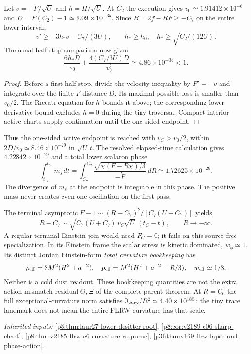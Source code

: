 \documentclass[12pt,a4paper]{article}
\begin{document}
Let $v=-\dot F/\sqrt U$ and $h=H/\sqrt U$. At $C_2$ the execution gives
$v_0\simeq1.91412\times10^{-6}$ and
$D=F(C_2)-1\simeq8.09\times10^{-35}$. Since $B=2f-RF\ge-C_7$
on the entire lower interval,
\[
 v'\ge-3h_*v-C_7/(3U),\qquad
 h_*\ge h_0,\quad h_*\ge\sqrt{C_2/(12U)}.
\]
The usual half-stop comparison now gives
\[
 \frac{6h_*D}{v_0}+\frac{4(C_7/3U)D}{v_0^2}
 \simeq4.86\times10^{-34}<1.
\]
\begin{proof}
Before a first half-stop, divide the velocity inequality by
$F'=-v$ and integrate over the finite $F$ distance $D$. Its maximal possible
loss is smaller than $v_0/2$. The Riccati equation for $h$ bounds it above;
the corresponding lower derivative bound excludes $h=0$ during the tiny
traversal. Compact interior active charts supply continuation until the
one-sided endpoint.
\end{proof}
Thus the one-sided active endpoint is reached with $v_C>v_0/2$, within
$2D/v_0\simeq8.46\times10^{-29}$ in $\sqrt U\,t$. The resolved elapsed-time
calculation gives $4.22842\times10^{-29}$ and a total lower scalaron phase
\[
 \boxed{\int_{t_{16}}^{t_C}m_s\,dt
 =\int_{C_7}^{C_2}\frac{\sqrt{\chi(F-R\chi)/3}}{-\dot F}\,dR
 \simeq1.72625\times10^{-29}.}
\]
The divergence of $m_s$ at the endpoint is integrable in this phase.
The positive mass never creates even one oscillation on the first pass.

The terminal asymptotic $F-1\sim(R-C_7)^2/[C_7(U+C_7)]$ yields
\[
 R-C_7\sim\sqrt{C_7(U+C_7)\,v_C\sqrt U\,(t_C-t)},\qquad
 \dot R\longrightarrow-\infty.
\]
A regular terminal Einstein join would need $\dot F_C=0$; it fails on this
source-free specialization. In its Einstein frame the scalar stress is
kinetic dominated, $w_\phi\simeq1$. Its distinct Jordan Einstein-form
\emph{total curvature bookkeeping} has
\[
 \rho_{\rm eff}=3M^2(H^2+a^{-2}),\quad
 p_{\rm eff}=M^2(H^2+a^{-2}-R/3),\quad w_{\rm eff}\simeq1/3.
\]
Neither is a cold dust readout. These bookkeeping quantities are not the
extra action-mismatch residual $\Theta,\Xi$ of the complete-parent theorem.
At $R=C_6$ the full exceptional-curvature norm satisfies
$\mathfrak I_{\rm curv}/R^2\simeq4.40\times10^{185}$: the tiny trace
landmark does not mean the entire FLRW curvature has that scale.
\par\noindent\textit{Inherited inputs:} \ref{p8:thm:laur27-lower-desitter-root}, \ref{p8:cor:v2189-c06-sharp-chart}, \ref{p8:thm:v2185-flrw-e6-curvature-response}, \ref{p3f:thm:v169-flrw-lapse-and-phase-action}.

\end{document}
